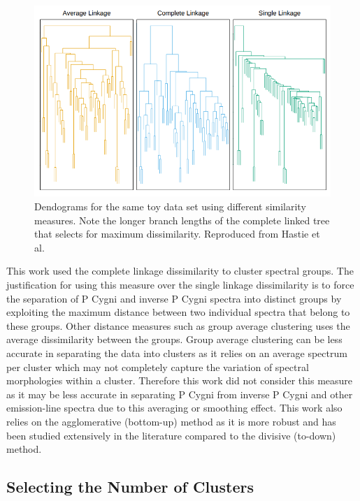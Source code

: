 \begin{figure}[!htb]
\centering
\includegraphics[scale=0.60]{figures/complete linkage.png}
\caption{Dendograms for the same toy data set using different similarity measures. Note the longer branch lengths of the complete linked tree that selects for maximum dissimilarity. Reproduced from Hastie et al.\cite{hastie2009elements}}
\end{figure}

This work used the complete linkage dissimilarity to cluster spectral groups. The justification for using this measure over the single linkage dissimilarity is to force the separation of P Cygni and inverse P Cygni spectra into distinct groups by exploiting the maximum distance between two individual spectra that belong to these groups. Other distance measures such as group average clustering uses the average dissimilarity between the groups. Group average clustering can be less accurate in separating the data into clusters as it relies on an average spectrum per cluster which may not completely capture the variation of spectral morphologies within a cluster. Therefore this work did not consider this measure as it may be less accurate in separating P Cygni from inverse P Cygni and other emission-line spectra due to this averaging or smoothing effect. This work also relies on the agglomerative (bottom-up) method as it is more robust and has been studied extensively in the literature compared to the divisive (to-down) method\cite{hastie2009elements}.

\subsection{Selecting the Number of Clusters}

